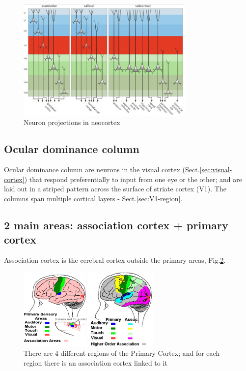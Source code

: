 \begin{figure}[htb]
  \centerline{\includegraphics[height=6cm]{./images/cortical-layer_rodent.eps}}
  \caption{Neuron projections in neocortex}\label{fig:cortical-layer_rodent}
\end{figure}




\subsection{Ocular dominance column}
\label{sec:ocular-dominance-column}

Ocular dominance column are neurons in the visual cortex
(Sect.\ref{sec:visual-cortex}) that respond preferentially to input from one eye
or the other; and are laid out in a striped pattern across the surface of
striate cortex (V1). The columns span multiple cortical layers -
Sect.\ref{sec:V1-region}.



\subsection{2 main areas: association cortex + primary cortex}
\label{sec:association-cortex}

Association cortex is the cerebral cortex outside the primary areas,
Fig.\ref{fig:primary-cortex_association-cortex}.

\begin{figure}[htb]
\centerline{\includegraphics[height=4cm]{./images/primary-cortex_association-cortex.eps}}
\caption{There are 4 different regions of the Primary Cortex; and for each
region there is an association cortex linked to it
}\label{fig:primary-cortex_association-cortex}
\end{figure} 

